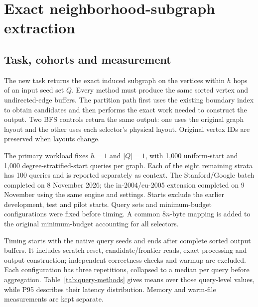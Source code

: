 \section{Exact neighborhood-subgraph extraction}
\label{sec:query}
\subsection{Task, cohorts and measurement}
The new task returns the exact induced subgraph on the vertices within $h$ hops of an input seed set $Q$. Every method must produce the same sorted vertex and undirected-edge buffers. The partition path first uses the existing boundary index to obtain candidates and then performs the exact work needed to construct the output. Two BFS controls return the same output: one uses the original graph layout and the other uses each selector's physical layout. Original vertex IDs are preserved when layouts change.

The primary workload fixes $h=1$ and $|Q|=1$, with 1,000 uniform-start and 1,000 degree-stratified-start queries per graph. Each of the eight remaining strata has 100 queries and is reported separately as context. The Stanford/Google batch completed on 8 November 2026; the in-2004/eu-2005 extension completed on 9 November using the same engine and settings. Starts exclude the earlier development, test and pilot starts. Query sets and minimum-budget configurations were fixed before timing. A common $8n$-byte mapping is added to the original minimum-budget accounting for all selectors.

\begin{table}[H]
\centering\tablefont\setlength{\tabcolsep}{5pt}
\caption{Primary workload: all partition selectors. Times are in microseconds, requested bytes in KiB ($2^{10}$ bytes). Random-P averages five seed-specific means; its P95 entry is the mean of five seed-specific P95 values, not the percentile of a pooled distribution.}
\label{tab:query-methods}

\end{table}

Timing starts with the native query seeds and ends after complete sorted output buffers. It includes scratch reset, candidate/frontier reads, exact processing and output construction; independent correctness checks and warmup are excluded. Each configuration has three repetitions, collapsed to a median per query before aggregation. Table~\ref{tab:query-methods} gives means over those query-level values, while P95 describes their latency distribution. Memory and warm-file measurements are kept separate.

